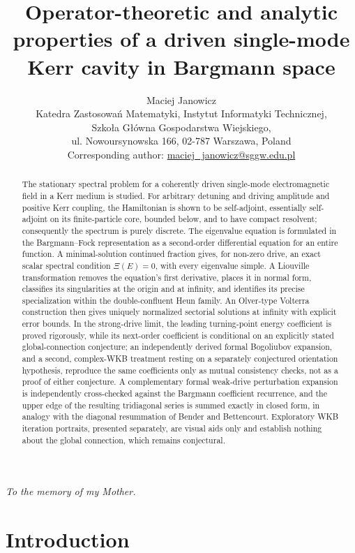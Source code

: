 \documentclass[11pt]{article}
\title{Operator-theoretic and analytic properties of a driven
single-mode Kerr cavity in Bargmann space}
\author{Maciej Janowicz\\
\normalsize Katedra Zastosowań Matematyki, Instytut Informatyki Technicznej,\\
\normalsize Szkoła Główna Gospodarstwa Wiejskiego,\\
\normalsize ul. Nowoursynowska 166, 02-787 Warszawa, Poland\\
\normalsize Corresponding author: \href{mailto:maciej_janowicz@sggw.edu.pl}{maciej\_janowicz@sggw.edu.pl}}
\date{}
\theoremstyle{remark}
\begin{document}
\maketitle

\begin{center}
\emph{To the memory of my Mother.}
\end{center}

\begin{abstract}
The stationary spectral problem for a coherently driven single-mode
electromagnetic field in a Kerr medium is studied.  For arbitrary detuning
and driving amplitude and positive Kerr coupling, the Hamiltonian is shown
to be self-adjoint, essentially self-adjoint on its finite-particle core,
bounded below, and to have compact resolvent; consequently the spectrum is
purely discrete.  The eigenvalue equation is formulated in the
Bargmann--Fock representation as a second-order differential equation for
an entire function.  A minimal-solution continued fraction gives, for non-zero drive,
an exact scalar spectral condition $\Xi(E)=0$, with every eigenvalue simple.
A Liouville transformation removes the equation's first derivative, places
it in normal form, classifies its singularities at the origin and at
infinity, and identifies its precise specialization within the
double-confluent Heun family.  An Olver-type Volterra construction then
gives uniquely normalized sectorial solutions at infinity with explicit
error bounds.  In the strong-drive limit, the leading turning-point energy
coefficient is proved rigorously, while its next-order coefficient is
conditional on an explicitly stated global-connection conjecture; an
independently derived formal Bogoliubov expansion, and a second,
complex-WKB treatment resting on a separately conjectured orientation
hypothesis, reproduce the same coefficients only as mutual consistency
checks, not as a proof of either conjecture.  A complementary formal
weak-drive perturbation expansion is independently cross-checked against
the Bargmann coefficient recurrence, and the upper edge of the resulting
tridiagonal series is summed exactly in closed form, in analogy with the
diagonal resummation of Bender and Bettencourt.  Exploratory WKB iteration
portraits, presented separately, are visual aids only and establish
nothing about the global connection, which remains conjectural.
\end{abstract}

\section{Introduction}
\label{sec:introduction}
\end{document}
